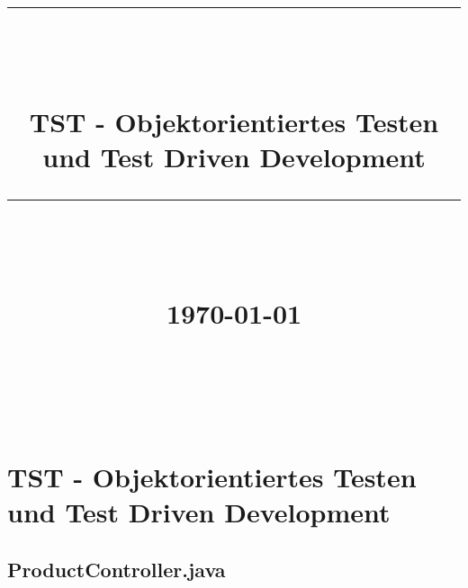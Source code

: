 \documentclass[12pt]{article}
\newcommand{\HRule}[1]{\rule{\linewidth}{#1}}
\begin{document}
\hypersetup{
    citecolor=black,
    filecolor=black,
    linkcolor=black,
    urlcolor=black
}


\title{ \normalsize
		\HRule{0.5pt} \\
		\LARGE \textbf{\uppercase{\newCommandDiscipline}} \\
    \smallbreak
    \small\textbf{{TST - Objektorientiertes Testen und Test Driven Development}}\\
		\HRule{2pt} \\ [0.5cm]
    \small\textbf{{\newCommandTerm}}\\
    [0.5cm]
    \normalsize \today \vspace*{10\baselineskip}}

\date{}



\author{
    \newCommandName \\
		\newCommandMatriculationNumber \\
		\newCommandUniversity \\
		\newCommandFaculty
}


\maketitle
\thispagestyle{empty}

\newpage

\thispagestyle{myfancy}
\tableofcontents
\newpage

\sectionfont{\scshape}


\section{TST - Objektorientiertes Testen und Test Driven Development}
\subsection{ProductController.java}
\end{document}
